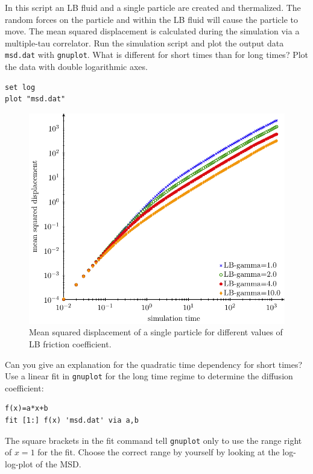 In this script an LB fluid and a single particle are created and
thermalized. 
The random forces on the particle and
within the LB fluid will cause the particle to move. The mean squared
displacement is calculated during the simulation via a multiple-tau correlator. 
Run the simulation script and plot the output data \texttt{msd.dat} with
\texttt{gnuplot}.
What is different for short times than for long times?
Plot the data with double logarithmic axes.
{\vspace{0,2cm}\small
\begin{lstlisting}[numbers=none]
set log
plot "msd.dat"
\end{lstlisting}\vspace{0,2cm}
}
\begin{figure}[h]
  \begin{center}
	  \includegraphics{figures/diffusion/msd.pdf}
  \end{center}
  \caption{Mean squared displacement of a single particle for different values
  of LB friction coefficient.}
\end{figure}

Can you give an explanation for the quadratic time dependency for short
times?
Use a linear fit in \texttt{gnuplot} for the long time regime to determine the 
diffusion coefficient:
{\vspace{0,2cm}\small
\begin{lstlisting}[numbers=none]
f(x)=a*x+b
fit [1:] f(x) 'msd.dat' via a,b
\end{lstlisting}\vspace{0,2cm}
}
The square brackets in the fit command tell \lstinline{gnuplot}
only to use the range right of $x=1$ for the fit. Choose the correct range by
yourself by looking at the log-log-plot of the MSD.


